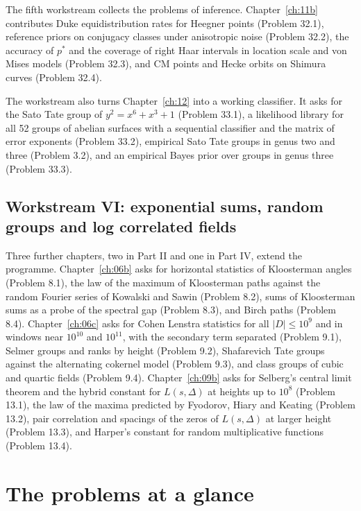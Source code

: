 The fifth workstream collects the problems of inference. Chapter~\ref{ch:11b} contributes Duke equidistribution rates for Heegner points (Problem 32.1), reference priors on conjugacy classes under anisotropic noise (Problem 32.2), the accuracy of $p^*$ and the coverage of right Haar intervals in location scale and von Mises models (Problem 32.3), and CM points and Hecke orbits on Shimura curves (Problem 32.4).

The workstream also turns Chapter~\ref{ch:12} into a working classifier. It asks for the Sato Tate group of $y^2=x^6+x^3+1$ (Problem 33.1), a likelihood library for all 52 groups of abelian surfaces with a sequential classifier and the matrix of error exponents (Problem 33.2), empirical Sato Tate groups in genus two and three (Problem 3.2), and an empirical Bayes prior over groups in genus three (Problem 33.3).

\subsection{Workstream VI: exponential sums, random groups and log correlated fields}

Three further chapters, two in Part II and one in Part IV, extend the programme. Chapter~\ref{ch:06b} asks for horizontal statistics of Kloosterman angles (Problem 8.1), the law of the maximum of Kloosterman paths against the random Fourier series of Kowalski and Sawin (Problem 8.2), sums of Kloosterman sums as a probe of the spectral gap (Problem 8.3), and Birch paths (Problem 8.4). Chapter~\ref{ch:06c} asks for Cohen Lenstra statistics for all $|D|\le10^9$ and in windows near $10^{10}$ and $10^{11}$, with the secondary term separated (Problem 9.1), Selmer groups and ranks by height (Problem 9.2), Shafarevich Tate groups against the alternating cokernel model (Problem 9.3), and class groups of cubic and quartic fields (Problem 9.4). Chapter~\ref{ch:09b} asks for Selberg's central limit theorem and the hybrid constant for $L(s,\Delta)$ at heights up to $10^8$ (Problem 13.1), the law of the maxima predicted by Fyodorov, Hiary and Keating (Problem 13.2), pair correlation and spacings of the zeros of $L(s,\Delta)$ at larger height (Problem 13.3), and Harper's constant for random multiplicative functions (Problem 13.4).

\section{The problems at a glance}


